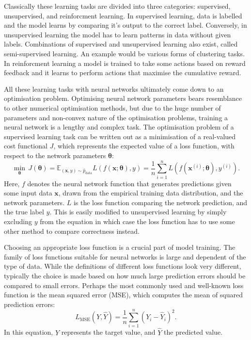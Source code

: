 Classically these learning tasks are divided into three categories: supervised, unsupervised, and reinforcment learning.
In supervised learning, data is labelled and the model learns by comparing it's output to the correct label.
Conversely, in unsupervised learning the model has to learn patterns in data without given labels.
Combinations of supervised and unsupervised learning also exist, called semi-supervised learning.
An example would be various forms of clustering tasks.
In reinforcment learning a model is trained to take some actions based on reward feedback and it learns to perform actions that maximise the cumulative reward. 

All these learning tasks with neural networks ultimately come down to an optimisation problem.
Optimising neural network parameters bears resemblance to other numerical optimisation methods, but due to the huge number of parameters and non-convex nature of the optimisation problems, training a neural network is a lengthy and complex task.
The optimisation problem of a supervised learning task can be written out as a minimisation of a real-valued cost functional $J$, which represents the expected value of a loss function, with respect to the network parameters $\bm{\theta}$:
\begin{equation}
    \min_{\bm{\theta}} \, J(\bm{\theta}) = \mathbb{E}_{(\bm{x},y) \sim \hat{p}_{\text{data}}} L(f(\bm{x}; \bm{\theta}), y) = \frac{1}{n} \sum_{i=1}^{n}  L(f(\bm{x}^{(i)}; \bm{\theta}), y^{(i)}).
\end{equation}
Here, $f$ denotes the neural network function that generates predictions given some input data $\bm{x}$, drawn from the empirical training data distribution, and the network parameters.
$L$ is the loss function comparing the network prediction, and the true label $y$.
This is easily modified to unsupervised learning by simply excluding $y$ from the equation in which case the loss function has to use some other method to compare correctness instead.

Choosing an appropriate loss function is a crucial part of model training.
The family of loss functions suitable for neural networks is large and dependent of the type of data.
While the definitions of different loss functions look very different, typically the choice is made based on how much large prediction errors should be compared to small errors.
Perhaps the most commonly used and well-known loss function is the mean squared error (MSE), which computes the mean of squared prediction errors:
\begin{equation}
    L_{\text{MSE}}(Y, \hat{Y}) = \frac{1}{n} \sum_{i=1}^{n} \left( Y_{i} - \hat{Y}_{i} \right)^{2}.
\end{equation}
In this equation, $Y$ represents the target value, and $\hat{Y}$ the predicted value.

